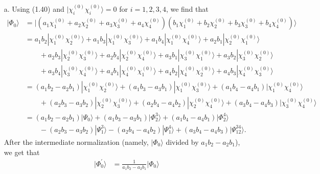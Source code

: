 \documentclass[a4paper]{book}
\newcounter{solution}[chapter]
\begin{document}
	\begin{solution}
	
	\begin{itemize}
	
	\item[a.] Using (1.40) and $| \chi^{(0)}_i \chi^{(0)}_i \rangle = 0$ for $i=1,2,3,4$, we find that
	\begin{align*}
		| \Phi_0 \rangle &= | ( a_1 \chi^{(0)}_1 + a_2 \chi^{(0)}_2 + a_3 \chi^{(0)}_3 + a_4 \chi^{(0)}_4 ) ( b_1 \chi^{(0)}_1 + b_2 \chi^{(0)}_2 + b_3 \chi^{(0)}_3 + b_4 \chi^{(0)}_4 ) \rangle	\\
		&= a_1 b_2 | \chi^{(0)}_1 \chi^{(0)}_2 \rangle + a_1 b_3 | \chi^{(0)}_1 \chi^{(0)}_3 \rangle + a_1 b_4 | \chi^{(0)}_1 \chi^{(0)}_4 \rangle + a_2 b_1 | \chi^{(0)}_2 \chi^{(0)}_1 \rangle \\
		&\hspace{2em} + a_2 b_3 | \chi^{(0)}_2 \chi^{(0)}_3 \rangle + a_2 b_4 | \chi^{(0)}_2 \chi^{(0)}_4 \rangle + a_3 b_1 | \chi^{(0)}_3 \chi^{(0)}_1 \rangle + a_3 b_2 | \chi^{(0)}_3 \chi^{(0)}_2 \rangle \\
		&\hspace{2em}  + a_3 b_4 | \chi^{(0)}_3 \chi^{(0)}_4 \rangle + a_4 b_1 | \chi^{(0)}_4 \chi^{(0)}_1 \rangle + a_4 b_2 | \chi^{(0)}_4 \chi^{(0)}_2 \rangle + a_4 b_3 | \chi^{(0)}_4 \chi^{(0)}_3 \rangle \\
		&= ( a_1 b_2 - a_2 b_1 ) | \chi^{(0)}_1 \chi^{(0)}_2 \rangle + ( a_1 b_3 - a_3 b_1 ) | \chi^{(0)}_1 \chi^{(0)}_3 \rangle + ( a_1 b_4  - a_4 b_1 ) | \chi^{(0)}_1 \chi^{(0)}_4 \rangle \\
		&\hspace{2em} + ( a_2 b_3 - a_3 b_2 ) | \chi^{(0)}_2 \chi^{(0)}_3 \rangle + ( a_2 b_4 - a_4 b_2 ) | \chi^{(0)}_2 \chi^{(0)}_4 \rangle + ( a_3 b_4  - a_4 b_3 ) | \chi^{(0)}_3 \chi^{(0)}_4 \rangle  \\
		&= ( a_1 b_2 - a_2 b_1 ) | \Psi_0 \rangle + ( a_1 b_3 - a_3 b_1 ) | \Phi^3_2 \rangle + ( a_1 b_4  - a_4 b_1 ) | \Phi^4_2 \rangle \\
		&\hspace{2em} - ( a_2 b_3 - a_3 b_2 ) | \Psi^3_1 \rangle - ( a_2 b_4 - a_4 b_2 ) | \Psi^4_1 \rangle + ( a_3 b_4  - a_4 b_3 ) | \Psi^{34}_{12} \rangle.
	\end{align*}
	After the intermediate normalization (namely, $| \Phi_0 \rangle$ divided by $a_1 b_2 - a_2 b_1$), we get that
	\begin{align*}
		| \Phi^\prime_0 \rangle &= \frac{1}{ a_1 b_2 - a_2 b_1 } | \Phi_0 \rangle \\

\end{align*}
\end{itemize}
\end{solution}
\end{document}
